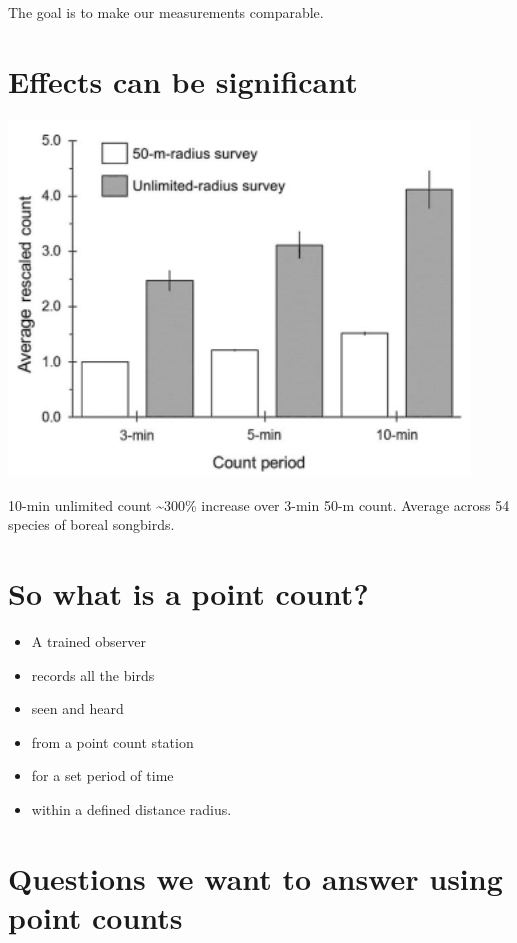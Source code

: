 \documentclass[12pt,]{scrbook}
\providecommand{\tightlist}{%
  \setlength{\itemsep}{0pt}\setlength{\parskip}{0pt}}
\begin{document}
The goal is to make our measurements comparable.

\hypertarget{effects-can-be-significant}{%
\section{Effects can be significant}\label{effects-can-be-significant}}

\includegraphics[width=4.82in]{./_images/matsuoka-2014-fig-2}

10-min unlimited count \textasciitilde{}300\% increase over 3-min 50-m count.
Average across 54 species of boreal songbirds.

\hypertarget{so-what-is-a-point-count}{%
\section{So what is a point count?}\label{so-what-is-a-point-count}}

\begin{itemize}
\tightlist
\item
  A trained observer
\item
  records all the birds
\item
  seen and heard
\item
  from a point count station
\item
  for a set period of time
\item
  within a defined distance radius.
\end{itemize}

\hypertarget{questions-we-want-to-answer-using-point-counts}{%
\section{Questions we want to answer using point counts}\label{questions-we-want-to-answer-using-point-counts}}
\end{document}

